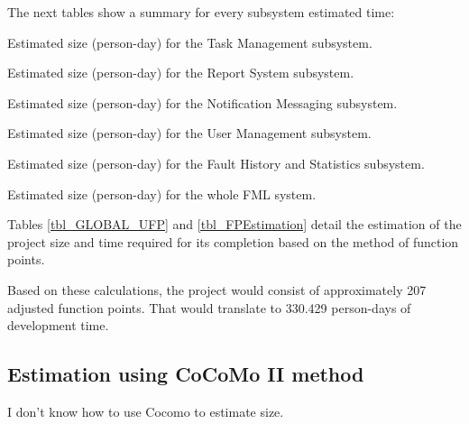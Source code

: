 The next tables show a summary for every subsystem estimated time:

\begin{table}[hbtp]
\centering

\caption{Estimated size (person-day) for the Task Management subsystem.}
\end{table}

\begin{table}[hbtp]
\centering

\caption{Estimated size (person-day) for the Report System subsystem.}
\end{table}

\begin{table}[hbtp]
\centering

\caption{Estimated size (person-day) for the Notification Messaging subsystem.}
\end{table}

\begin{table}[hbtp]
\centering

\caption{Estimated size (person-day) for the User Management subsystem.}
\end{table}

\begin{table}[hbtp]
\centering

\caption{Estimated size (person-day) for the Fault History and Statistics subsystem.}
\end{table}

\begin{table}[hbtp]
\centering

\caption{Estimated size (person-day) for the whole FML system.}
\label{tbl_FPEstimation}
\end{table}

Tables \ref{tbl_GLOBAL_UFP} and \ref{tbl_FPEstimation} detail the estimation of the project size and time required for its completion based on the method of function points. 

Based on these calculations, the project would consist of approximately 207 adjusted function points. That would translate to 330.429 person-days of development time.

\subsection{Estimation using CoCoMo II method}

I don't know how to use Cocomo to estimate size.

